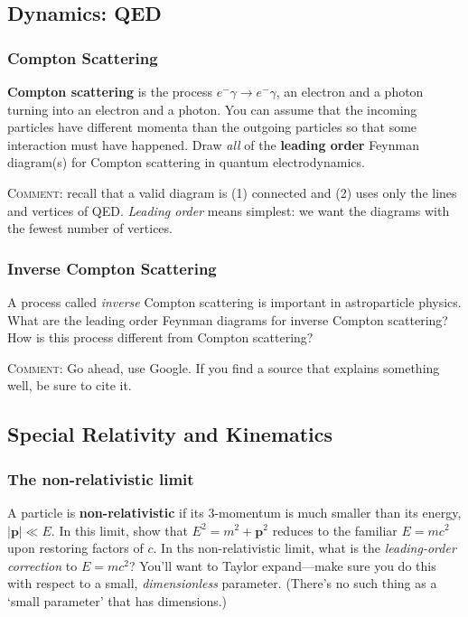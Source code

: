 \documentclass[12pt]{article}
\numberwithin{equation}{section}    %
\renewcommand{\vec}[1]{\mathbf{#1}} %
\begin{document}
\subsection{Dynamics: QED}

\subsubsection{Compton Scattering}

\textbf{Compton scattering} is the process $e^- \gamma \to e^- \gamma$, an electron and a photon turning into an electron and a photon. You can assume that the incoming particles have different momenta than the outgoing particles so that some interaction must have happened. Draw \emph{all} of the \textbf{leading order} Feynman diagram(s) for Compton scattering in quantum electrodynamics.

\textsc{Comment}: recall that a valid diagram is (1) connected and (2) uses only the lines and vertices of QED. \emph{Leading order} means simplest: we want the diagrams with the fewest number of vertices.

\subsubsection{Inverse Compton Scattering}

A process called \emph{inverse} Compton scattering is important in astroparticle physics. What are the leading order Feynman diagrams for inverse Compton scattering? How is this process different from Compton scattering? 

\textsc{Comment}: Go ahead, use Google. If you find a source that explains something well, be sure to cite it.


\subsection{Special Relativity and Kinematics}

\subsubsection{The non-relativistic limit}

A particle is \textbf{non-relativistic} if its 3-momentum is much smaller than its energy, $|\vec{p}| \ll E$. In this limit, show that $E^2 = m^2 + \vec{p}^2$ reduces to the familiar $E=mc^2$ upon restoring factors of $c$. In ths non-relativistic limit, what is the \emph{leading-order correction} to $E=mc^2$? You'll want to Taylor expand---make sure you do this with respect to a small, \emph{dimensionless} parameter. (There's no such thing as a `small parameter' that has dimensions.)
\end{document}
